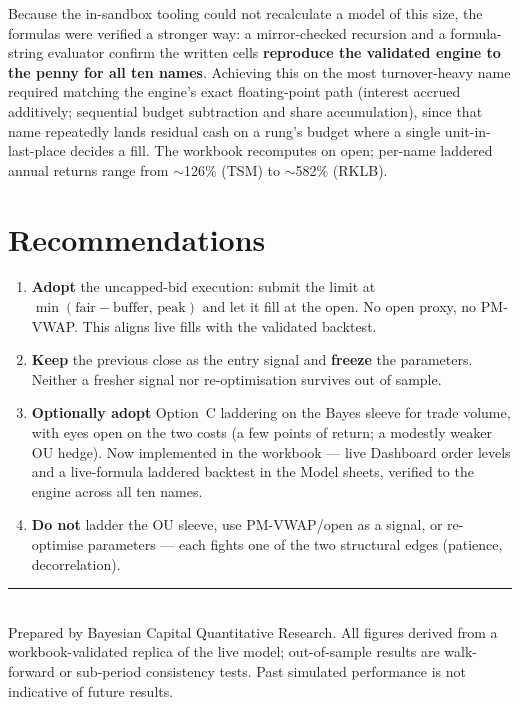 \documentclass[11pt]{article}
\begin{document}
Because the in-sandbox tooling could not recalculate a model of this size, the formulas were
verified a stronger way: a mirror-checked recursion and a formula-string evaluator confirm the
written cells \textbf{reproduce the validated engine to the penny for all ten names}. Achieving
this on the most turnover-heavy name required matching the engine's exact floating-point path
(interest accrued additively; sequential budget subtraction and share accumulation), since that
name repeatedly lands residual cash on a rung's budget where a single unit-in-last-place decides
a fill. The workbook recomputes on open; per-name laddered annual returns range from
$\sim$126\% (TSM) to $\sim$582\% (RKLB).

\section{Recommendations}

\begin{enumerate}[leftmargin=1.6em,itemsep=3pt]
  \item \textbf{Adopt} the uncapped-bid execution: submit the limit at
        $\min(\text{fair}-\text{buffer},\,\text{peak})$ and let it fill at the open. No open
        proxy, no PM-VWAP. This aligns live fills with the validated backtest.
  \item \textbf{Keep} the previous close as the entry signal and \textbf{freeze} the
        parameters. Neither a fresher signal nor re-optimisation survives out of sample.
  \item \textbf{Optionally adopt} Option~C laddering on the Bayes sleeve for trade volume,
        with eyes open on the two costs (a few points of return; a modestly weaker OU hedge).
        Now implemented in the workbook --- live Dashboard order levels and a live-formula
        laddered backtest in the Model sheets, verified to the engine across all ten names.
  \item \textbf{Do not} ladder the OU sleeve, use PM-VWAP/open as a signal, or re-optimise
        parameters --- each fights one of the two structural edges (patience, decorrelation).
\end{enumerate}

\vfill
{\color{bcrule}\rule{\textwidth}{0.4pt}}\\[-0.2cm]
{\footnotesize\color{bcgrey} Prepared by Bayesian Capital Quantitative Research. All figures
derived from a workbook-validated replica of the live model; out-of-sample results are
walk-forward or sub-period consistency tests. Past simulated performance is not indicative of
future results.}
\end{document}
